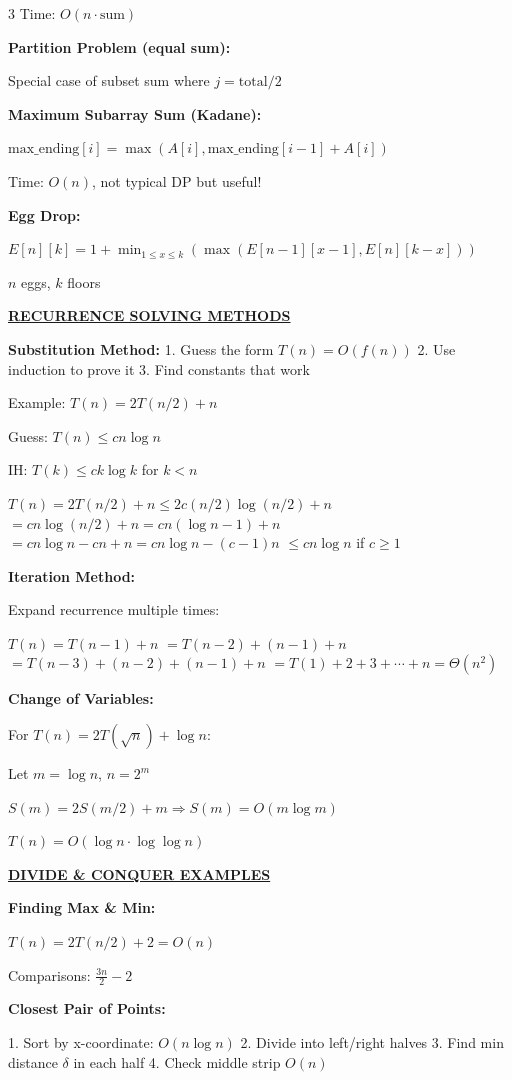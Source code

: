 \documentclass[7pt,landscape]{article}
\newcommand{\sect}[1]{\vspace{1mm}\textbf{\underline{#1}}\vspace{0.5mm}}
\begin{document}
\begin{multicols}{3}
Time: $O(n \cdot \text{sum})$

\textbf{Partition Problem (equal sum):}

Special case of subset sum where $j = \text{total}/2$

\textbf{Maximum Subarray Sum (Kadane):}

$\text{max\_ending}[i] = \max(A[i], \text{max\_ending}[i-1] + A[i])$

Time: $O(n)$, not typical DP but useful!

\textbf{Egg Drop:}

$E[n][k] = 1 + \min_{1 \leq x \leq k}(\max(E[n-1][x-1], E[n][k-x]))$

$n$ eggs, $k$ floors

\sect{RECURRENCE SOLVING METHODS}

\textbf{Substitution Method:}
1. Guess the form $T(n) = O(f(n))$
2. Use induction to prove it
3. Find constants that work

Example: $T(n) = 2T(n/2) + n$

Guess: $T(n) \leq cn\log n$

IH: $T(k) \leq ck\log k$ for $k < n$

$T(n) = 2T(n/2) + n \leq 2c(n/2)\log(n/2) + n$
$= cn\log(n/2) + n = cn(\log n - 1) + n$
$= cn\log n - cn + n = cn\log n - (c-1)n$
$\leq cn\log n$ if $c \geq 1$

\textbf{Iteration Method:}

Expand recurrence multiple times:

$T(n) = T(n-1) + n$
$= T(n-2) + (n-1) + n$
$= T(n-3) + (n-2) + (n-1) + n$
$= T(1) + 2 + 3 + \cdots + n = \Theta(n^2)$

\textbf{Change of Variables:}

For $T(n) = 2T(\sqrt{n}) + \log n$:

Let $m = \log n$, $n = 2^m$

$S(m) = 2S(m/2) + m \Rightarrow S(m) = O(m\log m)$

$T(n) = O(\log n \cdot \log\log n)$

\sect{DIVIDE \& CONQUER EXAMPLES}

\textbf{Finding Max \& Min:}

$T(n) = 2T(n/2) + 2 = O(n)$

Comparisons: $\frac{3n}{2} - 2$

\textbf{Closest Pair of Points:}

1. Sort by x-coordinate: $O(n\log n)$
2. Divide into left/right halves
3. Find min distance $\delta$ in each half
4. Check middle strip $O(n)$


\end{multicols}
\end{document}
